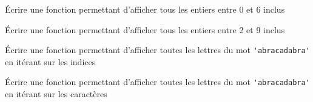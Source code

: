 	\begin{minipage}[t]{0.45\linewidth}
	\begin{exercice_cours}{Écrire une fonction permettant d'afficher tous les entiers entre 0 et 6 inclus}{}
	\end{exercice_cours}
	\end{minipage}\hspace{15pt}
	\begin{minipage}[t]{0.45\linewidth}
		\begin{exercice_cours}{Écrire une fonction permettant d'afficher tous les entiers entre 2 et 9 inclus}{}
		\end{exercice_cours}
	\end{minipage}
	
	
	\begin{minipage}[t]{0.45\linewidth}
		\begin{exercice_cours}{Écrire une fonction permettant d'afficher toutes les lettres du mot \verb+'abracadabra'+ en itérant sur les indices}{}
		\end{exercice_cours}
		\end{minipage}\hspace{15pt}
		\begin{minipage}[t]{0.45\linewidth}
			\begin{exercice_cours}{Écrire une fonction permettant d'afficher toutes les lettres du mot \verb+'abracadabra'+ en itérant sur les caractères}{}
			\end{exercice_cours}
	
		\end{minipage}
	
	
	
